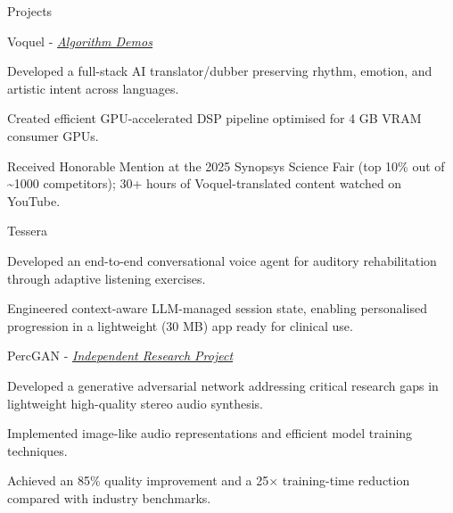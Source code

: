 \documentclass[
  10pt, %
]{resume}
\begin{document}
\begin{rSection}{Projects}

  
    \begin{rSubsection}{Voquel - \textit{\underline{\href{https://www.youtube.com/@translateanyaudio}{Algorithm Demos}}}}{}{}{}
        
      \item Developed a full-stack AI translator/dubber preserving rhythm, emotion, and artistic intent across languages.
          
      \item Created efficient GPU-accelerated DSP pipeline optimised for 4 GB VRAM consumer GPUs.
          
      \item Received Honorable Mention at the 2025 Synopsys Science Fair (top 10\% out of \textasciitilde{}1000 competitors); 30+ hours of Voquel-translated content watched on YouTube.
          
    \end{rSubsection}
        
    \begin{rSubsection}{Tessera}{}{}{}
        
      \item Developed an end-to-end conversational voice agent for auditory rehabilitation through adaptive listening exercises.
          
      \item Engineered context-aware LLM-managed session state, enabling personalised progression in a lightweight (30 MB) app ready for clinical use.
          
    \end{rSubsection}
        
    \begin{rSubsection}{PercGAN - \textit{\underline{\href{https://github.com/shuklabhay/percgan}{Independent Research Project}}}}{}{}{}
        
      \item Developed a generative adversarial network addressing critical research gaps in lightweight high-quality stereo audio synthesis.
          
      \item Implemented image-like audio representations and efficient model training techniques.
          
      \item Achieved an 85\% quality improvement and a 25× training-time reduction compared with industry benchmarks.
          

\end{rSubsection}
\end{rSection}
\end{document}
